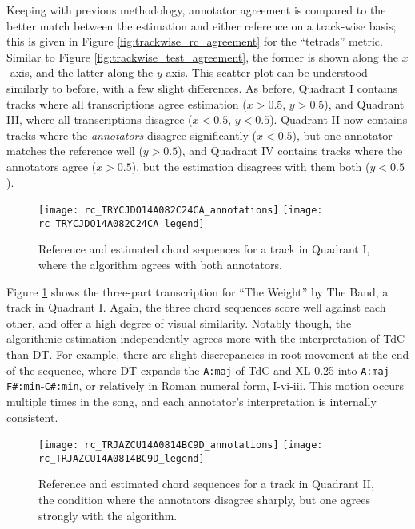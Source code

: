Keeping with previous methodology, annotator agreement is compared to the better match between the estimation and either reference on a track-wise basis; this is given in Figure \ref{fig:trackwise_rc_agreement} for the ``tetrads'' metric.
Similar to Figure \ref{fig:trackwise_test_agreement}, the former is shown along the $x$-axis, and the latter along the $y$-axis.
This scatter plot can be understood similarly to before, with a few slight differences.
As before, Quadrant I contains tracks where all transcriptions agree estimation ($x > 0.5$, $y > 0.5$), and Quadrant III, where all transcriptions disagree ($x < 0.5$, $y < 0.5$).
Quadrant II now contains tracks where the \emph{annotators} disagree significantly ($x < 0.5$), but one annotator matches the reference well ($y > 0.5$), and Quadrant IV contains tracks where the annotators agree ($x > 0.5$), but the estimation disagrees with them both ($y < 0.5$).


\begin{figure}[t!]
\centering
\texttt{[image: rc\_TRYCJDO14A082C24CA\_annotations]}
\texttt{[image: rc\_TRYCJDO14A082C24CA\_legend]}
\caption{Reference and estimated chord sequences for a track in Quadrant I, where the algorithm agrees with both annotators.}
\label{fig:rc_quadI}
\end{figure}

Figure \ref{fig:rc_quadI} shows the three-part transcription for ``The Weight'' by The Band, a track in Quadrant I.
Again, the three chord sequences score well against each other, and offer a high degree of visual similarity.
Notably though, the algorithmic estimation independently agrees more with the interpretation of TdC than DT.
For example, there are slight discrepancies in root movement at the end of the sequence, where DT expands the \texttt{A:maj} of TdC and XL-0.25 into \texttt{A:maj}-\texttt{F\#:min}-\texttt{C\#:min}, or relatively in Roman numeral form, I-vi-iii.
This motion occurs multiple times in the song, and each annotator's interpretation is internally consistent.

\begin{figure}[t!]
\centering
\texttt{[image: rc\_TRJAZCU14A0814BC9D\_annotations]}
\texttt{[image: rc\_TRJAZCU14A0814BC9D\_legend]}
\caption{Reference and estimated chord sequences for a track in Quadrant II, the condition where the annotators disagree sharply, but one agrees strongly with the algorithm.}
\label{fig:rc_quadII}
\end{figure}

